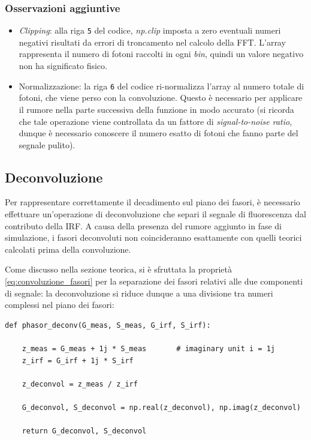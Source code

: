 \subsubsection{Osservazioni aggiuntive}
\begin{itemize}
    \item \textit{Clipping}: alla riga \texttt{5} del codice, \textit{np.clip} imposta a zero eventuali numeri negativi risultati da errori di troncamento nel calcolo della FFT. L'array rappresenta il numero di fotoni raccolti in ogni \textit{bin}, quindi un valore negativo non ha significato fisico.
    \item Normalizzazione: la riga \texttt{6} del codice ri-normalizza l'array al numero totale di fotoni, che viene perso con la convoluzione. Questo è necessario per applicare il rumore nella parte successiva della funzione in modo accurato (si ricorda che tale operazione viene controllata da un fattore di \textit{signal-to-noise ratio}, dunque è necessario conoscere il numero esatto di fotoni che fanno parte del segnale pulito).
\end{itemize}



\subsection{Deconvoluzione}
\label{sec:deconvoluzione}
Per rappresentare correttamente il decadimento sul piano dei fasori, è necessario effettuare un'operazione di deconvoluzione che separi il segnale di fluorescenza dal contributo della IRF. A causa della presenza del rumore aggiunto in fase di simulazione, i fasori deconvoluti non coincideranno esattamente con quelli teorici calcolati prima della convoluzione.

Come discusso nella sezione teorica, si è sfruttata la proprietà \ref{eq:convoluzione_fasori} per la separazione dei fasori relativi alle due componenti di segnale: la deconvoluzione si riduce dunque a una divisione tra numeri complessi nel piano dei fasori:
\begin{verbatim}
def phasor_deconv(G_meas, S_meas, G_irf, S_irf): 
 
    z_meas = G_meas + 1j * S_meas       # imaginary unit i = 1j
    z_irf = G_irf + 1j * S_irf
    
    z_deconvol = z_meas / z_irf
    
    G_deconvol, S_deconvol = np.real(z_deconvol), np.imag(z_deconvol)
    
    return G_deconvol, S_deconvol
\end{verbatim}   

